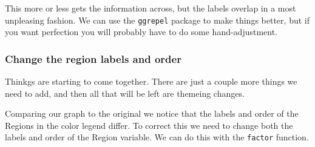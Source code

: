 \documentclass[]{book}
\newenvironment{Shaded}{\begin{snugshade}}{\end{snugshade}}
\newcommand{\KeywordTok}[1]{\textcolor[rgb]{0.13,0.29,0.53}{\textbf{#1}}}
\newcommand{\DataTypeTok}[1]{\textcolor[rgb]{0.13,0.29,0.53}{#1}}
\newcommand{\DecValTok}[1]{\textcolor[rgb]{0.00,0.00,0.81}{#1}}
\newcommand{\CharTok}[1]{\textcolor[rgb]{0.31,0.60,0.02}{#1}}
\newcommand{\StringTok}[1]{\textcolor[rgb]{0.31,0.60,0.02}{#1}}
\newcommand{\OperatorTok}[1]{\textcolor[rgb]{0.81,0.36,0.00}{\textbf{#1}}}
\newcommand{\NormalTok}[1]{#1}
\begin{document}
This more or less gets the information across, but the labels overlap in
a most unpleasing fashion. We can use the \texttt{ggrepel} package to
make things better, but if you want perfection you will probably have to
do some hand-adjustment.

\begin{Shaded}
\end{Shaded}

\subsubsection{Change the region labels and
order}\label{change-the-region-labels-and-order}

Thinkgs are starting to come together. There are just a couple more
things we need to add, and then all that will be left are themeing
changes.

Comparing our graph to the original we notice that the labels and order
of the Regions in the color legend differ. To correct this we need to
change both the labels and order of the Region variable. We can do this
with the \texttt{factor} function.

\begin{Shaded}
\end{Shaded}
\end{document}

